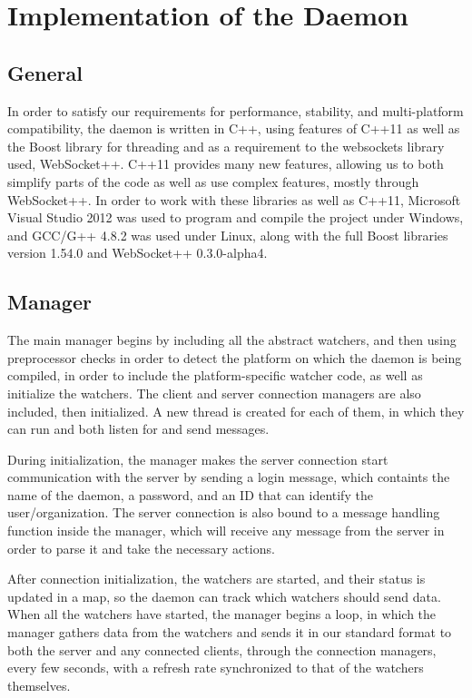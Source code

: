 \documentclass{l3proj}
\begin{document}
\section{Implementation of the Daemon}

\subsection{General}

In order to satisfy our requirements for performance, stability, and multi-platform compatibility, the daemon is written in C++, using features of C++11 as well as the Boost library for threading and as a requirement to the websockets library used, WebSocket++.
C++11 provides many new features, allowing us to both simplify parts of the code as well as use complex features, mostly through WebSocket++. In order to work with these libraries as well as C++11, Microsoft Visual Studio 2012 was used to program and compile the project under Windows, and GCC/G++ 4.8.2 was used under Linux, along with the full Boost libraries version 1.54.0 and WebSocket++ 0.3.0-alpha4.

\subsection{Manager}

The main manager begins by including all the abstract watchers, and then using preprocessor checks in order to detect the platform on which the daemon is being compiled, in order to include the platform-specific watcher code, as well as initialize the watchers. The client and server connection managers are also included, then initialized. A new thread is created for each of them, in which they can run and both listen for and send messages. 

During initialization, the manager makes the server connection start communication with the server by sending a login message, which containts the name of the daemon, a password, and an ID that can identify the user/organization. The server connection is also bound to a message handling function inside the manager, which will receive any message from the server in order to parse it and take the necessary actions.

After connection initialization, the watchers are started, and their status is updated in a map, so the daemon can track which watchers should send data. When all the watchers have started, the manager begins a loop, in which the manager gathers data from the watchers and sends it in our standard format to both the server and any connected clients, through the connection managers, every few seconds, with a refresh rate synchronized to that of the watchers themselves.
\end{document}
